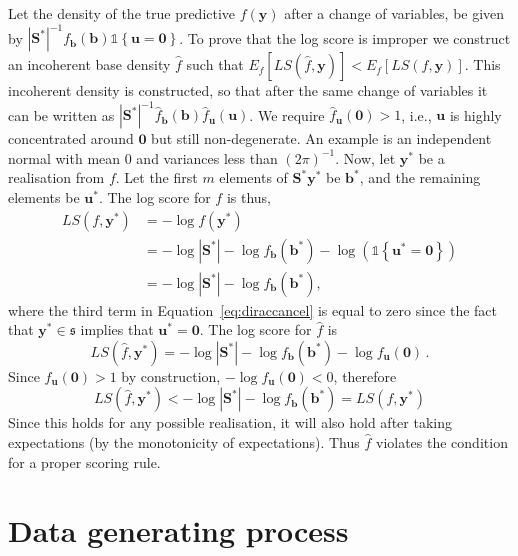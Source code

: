 \documentclass[12pt]{article}
\theoremstyle{definition}
\begin{document}
Let the density of the true predictive $f(\bm{y})$ after a change of variables, be given by $|\bm{S^*}|^{-1}f_{\bm b}(\bm{b})\mathbb{1}\left\{\bm{u}=\bm{0}\right\}$.  To prove that the log score is improper we construct an incoherent base density $\hat{f}$ such that $E_f\left[LS\left(\hat{f},\bm{y}\right)\right]<E_f\left[LS\left(f,\bm{y}\right)\right]$. This incoherent density is constructed, so that after the same change of variables it can be written as $|\bm{S^*}|^{-1}\hat{f}_{\bm b}(\bm{b})\hat{f}_{\bm{u}}(\bm{u})$. We require $\hat{f}_{\bm u}(\bm{0})>1$, i.e., ${\bm u}$ is highly concentrated around $\bm{0}$ but still non-degenerate. An example is an independent normal with mean 0 and variances less than $(2\pi)^{-1}$. Now, let $\bm{y}^*$ be a realisation from $f$. Let the first $m$ elements of $\bm{S}^*\bm{y}^*$ be $\bm{b^*}$, and the remaining elements be ${\bm u}^*$.  The log score for $f$ is thus,	
\begin{align}
LS\left(f,\bm{y}^*\right) &= -\log f(\bm{y}^*) \nonumber\\
&=-\log|\bm{S^*}|-\log f_{\bm{b}}\left(\bm{b}^*\right)-\log\left(\mathbb{1}\left\{\bm{u}^*=\bm{0}\right\}\right)\label{eq:diraccancel}\\
&=-\log|\bm{S^*}|-\log f_{\bm{b}}\left(\bm{b}^*\right),\nonumber
\end{align}
where the third term in Equation~\ref{eq:diraccancel} is equal to zero since the fact that $\bm{y}^*\in\mathfrak{s}$ implies that $\bm{u}^*=\bm{0}$.  The log score for $\hat{f}$ is
\[
LS\left(\hat{f},\bm{y}^*\right) = -\log|\bm{S^*}|-\log f_{\bm{b}}(\bm{b}^*)- \log f_{\bm u}(\bm{0})\,.
\]
Since $f_{\bm u}(\bm{0})>1$ by construction, $-\log f_{\bm u}(\bm{0})<0$, therefore
\[
LS\left(\hat{f},\bm{y}^*\right) <-\log|\bm{S^*}|-\log f_{\bm b}(\bm{b}^*)=LS\left(f,\bm{y}^*\right)
\]
Since this holds for any possible realisation, it will also hold after taking expectations (by the monotonicity of expectations).  Thus $\hat{f}$ violates the condition for a proper scoring rule.

\clearpage
\section{Data generating process} \label{app:DGP}
\end{document}
